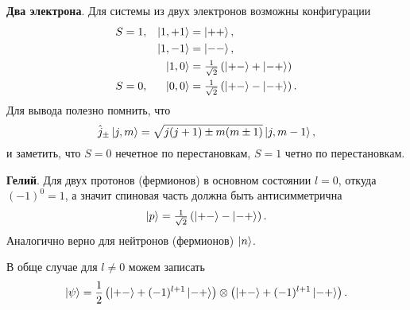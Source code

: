 

\textbf{Два электрона}. Для системы из двух электронов возможны конфигурации
\begin{align*}
	&S = 1, &\left| 1,+1 \right\rangle &= \left| ++ \right\rangle, \\
	&&\left| 1,-1 \right\rangle &= \left| -- \right\rangle,\\
	&&\left| 1,0 \right\rangle &= \tfrac{1}{\sqrt{2}} \left(\left| +- \right\rangle+\left| -+ \right\rangle\right)\\
	&S=0, &\left| 0,0 \right\rangle &= \tfrac{1}{\sqrt{2}}\left(\left| +- \right\rangle - \left| -+ \right\rangle\right).
\end{align*}
Для вывода полезно помнить, что
\begin{equation*}
	\hat{j}_\pm \left| j, m \right\rangle = \sqrt{j(j+1) \pm m(m\pm1)} \left| j,m-1 \right\rangle,
\end{equation*}
и заметить, что $S=0$ нечетное по перестановкам, $S=1$ четно по перестановкам. 

\textbf{Гелий}. Для двух протонов (фермионов) в основном состоянии $l=0$, откуда $(-1)^0 = 1$, а значит спиновая часть должна быть антисимметрична
\begin{equation*}
	\left| p \right\rangle = \tfrac{1}{\sqrt{2}}\left(\left| +- \right\rangle-\left| -+ \right\rangle\right).
\end{equation*}
Аналогично верно для нейтронов (фермионов) $\left| n \right\rangle$.

В обще случае для $l \neq 0$ можем записать 
\begin{equation*}
	\left| \psi \right\rangle = \frac{1}{2} \left(
		\left| +- \right\rangle + (-1)^{l+1} \left| -+ \right\rangle
	\right) \otimes \left(
		\left| +- \right\rangle + (-1)^{l+1} \left| -+ \right\rangle
	\right).
\end{equation*}
